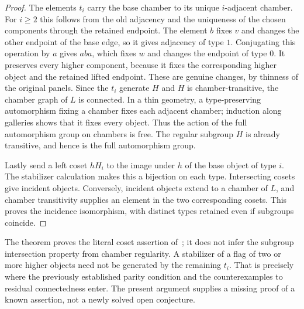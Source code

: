 \begin{proof}
The elements $t_i$ carry the base chamber to its unique
$i$-adjacent chamber. For $i\ge2$ this follows from the old
adjacency and the uniqueness of the chosen components through
the retained endpoint. The element $b$ fixes $v$ and changes
the other endpoint of the base edge, so it gives adjacency
of type $1$. Conjugating this operation by $a$ gives $aba$,
which fixes $w$ and changes the endpoint of type $0$.
It preserves every higher component, because it fixes the
corresponding higher object and the retained lifted endpoint.
These are genuine changes, by thinness of the original panels.
Since the $t_i$ generate $H$ and $H$ is chamber-transitive,
the chamber graph of $L$ is connected. In a thin geometry,
a type-preserving automorphism fixing a chamber fixes each
adjacent chamber; induction along galleries shows that it
fixes every object. Thus the action of the full automorphism
group on chambers is free. The regular subgroup $H$ is already
transitive, and hence is the full automorphism group.

Lastly send a left coset $hH_i$ to the image under $h$ of the
base object of type $i$. The stabilizer calculation makes
this a bijection on each type. Intersecting cosets give
incident objects. Conversely, incident objects extend to a
chamber of $L$, and chamber transitivity supplies an element
in the two corresponding cosets. This proves the incidence
isomorphism, with distinct types retained even if subgroups
coincide.
\end{proof}

The theorem proves the literal coset assertion of~\cite{PT};
it does not infer the subgroup intersection property from
chamber regularity. A stabilizer of a flag of two or more
higher objects need not be generated by the remaining $t_i$.
That is precisely where the previously established parity
condition and the counterexamples to residual connectedness
enter. The present argument supplies a missing proof of a
known assertion, not a newly solved open conjecture.
